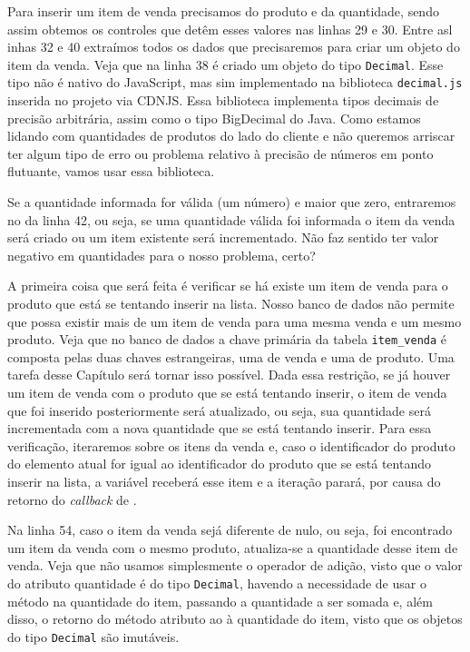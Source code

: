Para inserir um item de venda precisamos do produto e da quantidade, sendo assim obtemos os controles que detêm esses valores nas linhas 29 e 30. Entre asl inhas 32 e 40 extraímos todos os dados que precisaremos para criar um objeto do item da venda. Veja que na linha 38 é criado um objeto do tipo \texttt{Decimal}. Esse tipo não é nativo do JavaScript, mas sim implementado na biblioteca \texttt{decimal.js} inserida no projeto via CDNJS. Essa biblioteca implementa tipos decimais de precisão arbitrária, assim como o tipo BigDecimal do Java. Como estamos lidando com quantidades de produtos do lado do cliente e não queremos arriscar ter algum tipo de erro ou problema relativo à precisão de números em ponto flutuante, vamos usar essa biblioteca.

Se a quantidade informada for válida (um número) e maior que zero, entraremos no  da linha 42, ou seja, se uma quantidade válida foi informada o item da venda será criado ou um item existente será incrementado. Não faz sentido ter valor negativo em quantidades para o nosso problema, certo?

A primeira coisa que será feita é verificar se há existe um item de venda para o produto que está se tentando inserir na lista. Nosso banco de dados não permite que possa existir mais de um item de venda para uma mesma venda e um mesmo produto. Veja que no banco de dados a chave primária da tabela \texttt{item\_venda} é composta pelas duas chaves estrangeiras, uma de venda e uma de produto. Uma tarefa desse Capítulo será tornar isso possível. Dada essa restrição, se já houver um item de venda com o produto que se está tentando inserir, o item de venda que foi inserido posteriormente será atualizado, ou seja, sua quantidade será incrementada com a nova quantidade que se está tentando inserir. Para essa verificação, iteraremos sobre os itens da venda e, caso o identificador do produto do elemento atual for igual ao identificador do produto que se está tentando inserir na lista, a variável  receberá esse item e a iteração parará, por causa do retorno  do \textit{callback} de .

Na linha 54, caso o item da venda sejá diferente de nulo, ou seja, foi encontrado um item da venda com o mesmo produto, atualiza-se a quantidade desse item de venda. Veja que não usamos simplesmente o operador de adição, visto que o valor do atributo quantidade é do tipo \texttt{Decimal}, havendo a necessidade de usar o método  na quantidade do item, passando a quantidade a ser somada e, além disso, o retorno do método atributo ao à quantidade do item, visto que os objetos do tipo \texttt{Decimal} são imutáveis.

